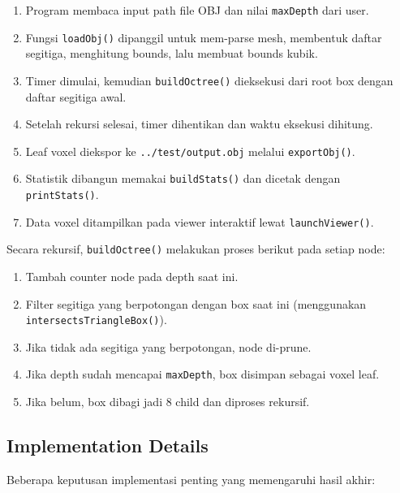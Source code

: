 \documentclass[11pt,a4paper]{article}
\begin{document}
\begin{enumerate}
    \item Program membaca input path file OBJ dan nilai \texttt{maxDepth} dari user.
    \item Fungsi \texttt{loadObj()} dipanggil untuk mem-parse mesh,
    membentuk daftar segitiga, menghitung bounds, lalu membuat bounds kubik.
    \item Timer dimulai, kemudian \texttt{buildOctree()} dieksekusi dari root box
    dengan daftar segitiga awal.
    \item Setelah rekursi selesai, timer dihentikan dan waktu eksekusi dihitung.
    \item Leaf voxel diekspor ke \texttt{../test/output.obj} melalui \texttt{exportObj()}.
    \item Statistik dibangun memakai \texttt{buildStats()} dan dicetak dengan
    \texttt{printStats()}.
    \item Data voxel ditampilkan pada viewer interaktif lewat \texttt{launchViewer()}.
\end{enumerate}

Secara rekursif, \texttt{buildOctree()} melakukan proses berikut pada setiap node:

\begin{enumerate}
    \item Tambah counter node pada depth saat ini.
    \item Filter segitiga yang berpotongan dengan box saat ini
    (menggunakan \texttt{intersectsTriangleBox()}).
    \item Jika tidak ada segitiga yang berpotongan, node di-prune.
    \item Jika depth sudah mencapai \texttt{maxDepth}, box disimpan sebagai voxel leaf.
    \item Jika belum, box dibagi jadi 8 child dan diproses rekursif.
\end{enumerate}

\subsection{Implementation Details}
Beberapa keputusan implementasi penting yang memengaruhi hasil akhir:
\end{document}
